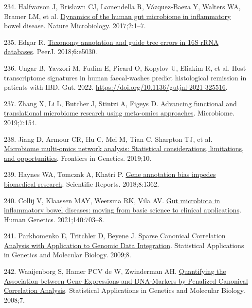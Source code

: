 \documentclass[
  12pt,
  a4paper,
  twoside,
  openright]{book}
\newlength{\cslhangindent}
\newlength{\cslentryspacingunit} %
\newenvironment{CSLReferences}[2] %
 {%
  \setlength{\parindent}{0pt}
  \ifodd #1
  \let\oldpar\par
  \def\par{\hangindent=\cslhangindent\oldpar}
  \fi
  \setlength{\parskip}{#2\cslentryspacingunit}
 }%
 {}
\begin{document}
\begin{CSLReferences}{0}{0}
\leavevmode{}%
234. Halfvarson J, Brislawn CJ, Lamendella R, Vázquez-Baeza Y, Walters WA, Bramer LM, et al. \href{https://doi.org/10.1038/nmicrobiol.2017.4}{Dynamics of the human gut microbiome in inflammatory bowel disease}. Nature Microbiology. 2017;2:1--7.

\leavevmode{}%
235. Edgar R. \href{https://doi.org/10.7717/peerj.5030}{Taxonomy annotation and guide tree errors in 16S rRNA databases}. PeerJ. 2018;6:e5030.

\leavevmode{}%
236. Ungar B, Yavzori M, Fudim E, Picard O, Kopylov U, Eliakim R, et al. Host transcriptome signatures in human faecal-washes predict histological remission in patients with IBD. Gut. 2022. \url{https://doi.org/10.1136/gutjnl-2021-325516}.

\leavevmode{}%
237. Zhang X, Li L, Butcher J, Stintzi A, Figeys D. \href{https://doi.org/10.1186/s40168-019-0767-6}{Advancing functional and translational microbiome research using meta-omics approaches}. Microbiome. 2019;7:154.

\leavevmode{}%
238. Jiang D, Armour CR, Hu C, Mei M, Tian C, Sharpton TJ, et al. \href{https://doi.org/10.3389/fgene.2019.00995}{Microbiome multi-omics network analysis: Statistical considerations, limitations, and opportunities}. Frontiers in Genetics. 2019;10.

\leavevmode{}%
239. Haynes WA, Tomczak A, Khatri P. \href{https://doi.org/10.1038/s41598-018-19333-x}{Gene annotation bias impedes biomedical research}. Scientific Reports. 2018;8:1362.

\leavevmode{}%
240. Collij V, Klaassen MAY, Weersma RK, Vila AV. \href{https://doi.org/10.1007/s00439-020-02218-3}{Gut microbiota in inflammatory bowel diseases: moving from basic science to clinical applications}. Human Genetics. 2021;140:703--8.

\leavevmode{}%
241. Parkhomenko E, Tritchler D, Beyene J. \href{https://doi.org/10.2202/1544-6115.1406}{Sparse Canonical Correlation Analysis with Application to Genomic Data Integration}. Statistical Applications in Genetics and Molecular Biology. 2009;8.

\leavevmode{}%
242. Waaijenborg S, Hamer PCV de W, Zwinderman AH. \href{https://doi.org/10.2202/1544-6115.1329}{Quantifying the Association between Gene Expressions and DNA-Markers by Penalized Canonical Correlation Analysis}. Statistical Applications in Genetics and Molecular Biology. 2008;7.


\end{CSLReferences}
\end{document}

